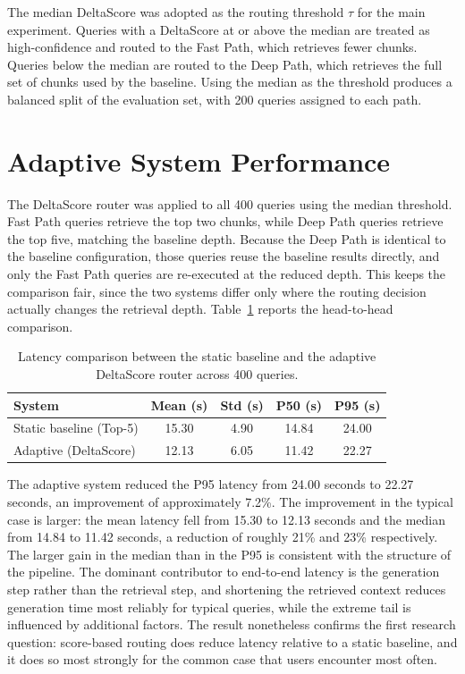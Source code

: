 \documentclass[12pt, a4paper, oneside]{report}
\begin{document}
The median DeltaScore was adopted as the routing threshold $\tau$ for the main experiment. Queries with a DeltaScore at or above the median are treated as high-confidence and routed to the Fast Path, which retrieves fewer chunks. Queries below the median are routed to the Deep Path, which retrieves the full set of chunks used by the baseline. Using the median as the threshold produces a balanced split of the evaluation set, with 200 queries assigned to each path.

\section{Adaptive System Performance}

The DeltaScore router was applied to all 400 queries using the median threshold. Fast Path queries retrieve the top two chunks, while Deep Path queries retrieve the top five, matching the baseline depth. Because the Deep Path is identical to the baseline configuration, those queries reuse the baseline results directly, and only the Fast Path queries are re-executed at the reduced depth. This keeps the comparison fair, since the two systems differ only where the routing decision actually changes the retrieval depth. Table~\ref{tab:comparison} reports the head-to-head comparison.

\begin{table}[ht]
\centering
\caption{Latency comparison between the static baseline and the adaptive DeltaScore router across 400 queries.}
\label{tab:comparison}
\begin{tabular}{@{}lcccc@{}}
\toprule
\textbf{System} & \textbf{Mean (s)} & \textbf{Std (s)} & \textbf{P50 (s)} & \textbf{P95 (s)} \\
\midrule
Static baseline (Top-5) & 15.30 & 4.90 & 14.84 & 24.00 \\
Adaptive (DeltaScore)   & 12.13 & 6.05 & 11.42 & 22.27 \\
\bottomrule
\end{tabular}
\end{table}

The adaptive system reduced the P95 latency from 24.00 seconds to 22.27 seconds, an improvement of approximately 7.2\%. The improvement in the typical case is larger: the mean latency fell from 15.30 to 12.13 seconds and the median from 14.84 to 11.42 seconds, a reduction of roughly 21\% and 23\% respectively. The larger gain in the median than in the P95 is consistent with the structure of the pipeline. The dominant contributor to end-to-end latency is the generation step rather than the retrieval step, and shortening the retrieved context reduces generation time most reliably for typical queries, while the extreme tail is influenced by additional factors. The result nonetheless confirms the first research question: score-based routing does reduce latency relative to a static baseline, and it does so most strongly for the common case that users encounter most often.
\end{document}
